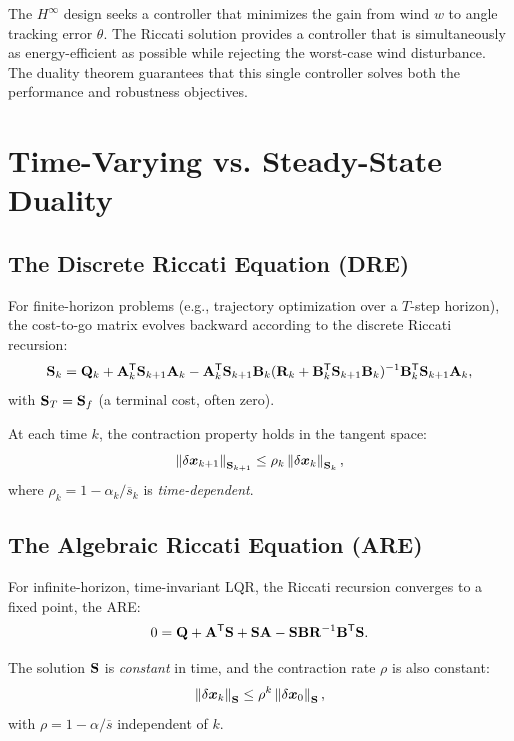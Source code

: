 The $H^\infty$ design seeks a controller that minimizes the gain from wind $w$ to angle tracking error $\theta$. The
Riccati solution provides a controller that is simultaneously as energy-efficient as possible while rejecting the worst-case
wind disturbance. The duality theorem guarantees that this single controller solves both the performance and robustness
objectives.

\section{Time-Varying vs. Steady-State Duality}

\subsection{The Discrete Riccati Equation (DRE)}

For finite-horizon problems (e.g., trajectory optimization over a $T$-step horizon), the cost-to-go matrix evolves backward
according to the discrete Riccati recursion:
\begin{equation}
\mathbf{S}_k = \mathbf{Q}_k + \mathbf{A}_k^{\mathsf{T}}\mathbf{S}_{k+1}\mathbf{A}_k - \mathbf{A}_k^{\mathsf{T}}\mathbf{S}_{k+1}\mathbf{B}_k(\mathbf{R}_k + \mathbf{B}_k^{\mathsf{T}}\mathbf{S}_{k+1}\mathbf{B}_k)^{-1}\mathbf{B}_k^{\mathsf{T}}\mathbf{S}_{k+1}\mathbf{A}_k,
\label{eq:ch6:dre-discrete}
\end{equation}
with $\mathbf{S}_T = \mathbf{S}_f$ (a terminal cost, often zero).

At each time $k$, the contraction property holds in the tangent space:
\begin{equation}
\left\lVert \delta\bm{x}_{k+1} \right\rVert_{\mathbf{S}_{k+1}} \leq \rho_k \left\lVert \delta\bm{x}_k \right\rVert_{\mathbf{S}_k},
\label{eq:ch6:time-varying-contraction}
\end{equation}
where $\rho_k = 1 - \alpha_k/\overline{s}_k$ is \textit{time-dependent}.

\subsection{The Algebraic Riccati Equation (ARE)}

For infinite-horizon, time-invariant LQR, the Riccati recursion converges to a fixed point, the ARE:
\begin{equation}
0 = \mathbf{Q} + \mathbf{A}^{\mathsf{T}}\mathbf{S} + \mathbf{S}\mathbf{A} - \mathbf{S}\mathbf{B}\mathbf{R}^{-1}\mathbf{B}^{\mathsf{T}}\mathbf{S}.
\label{eq:ch6:are-again}
\end{equation}

The solution $\mathbf{S}$ is \textit{constant} in time, and the contraction rate $\rho$ is also constant:
\begin{equation}
\left\lVert \delta\bm{x}_k \right\rVert_{\mathbf{S}} \leq \rho^k \left\lVert \delta\bm{x}_0 \right\rVert_{\mathbf{S}},
\label{eq:ch6:steady-state-contraction}
\end{equation}
with $\rho = 1 - \alpha/\overline{s}$ independent of $k$.


